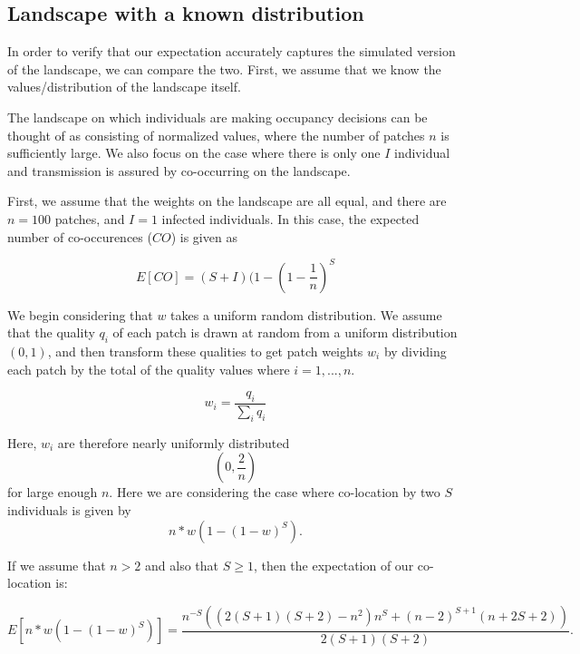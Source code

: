 \subsection{Landscape with a known distribution}

In order to verify that our expectation accurately captures the simulated version of the landscape, we can compare the two. First, we assume that we know the values/distribution of the landscape itself.

The landscape on which individuals are making occupancy decisions can be thought of as consisting of normalized values, where the number of patches $n$ is sufficiently large. We also focus on the case where there is only one $I$ individual and transmission is assured by co-occurring on the landscape.

First, we assume that the weights on the landscape are all equal, and there are $n=100$ patches, and $I=1$ infected individuals. In this case, the expected number of co-occurences ($CO$) is given as 

\begin{equation}
    E[CO] = (S+I)(1-(1-\frac{1}{n})^S
\end{equation}


We begin considering that $w$ takes a uniform random distribution. We assume that the quality $q_i$ of each patch is drawn at random from a uniform distribution $(0,1)$, and then transform these qualities to get patch weights $w_i$ by dividing each patch by the total of the quality values where $i = 1,...,n$. 

\begin{equation}
    w_i = \frac{q_i}{\sum_i{q_i}}
\end{equation}

Here, $w_i$ are therefore nearly uniformly distributed 
\begin{equation}
    (0, \frac{2}{n})
\end{equation} 
for large enough $n$. Here we are considering the case where co-location by two $S$ individuals is given by 
\begin{equation}
    n*w(1-(1-w)^S).
\end{equation} 

If we assume that $n>2$ and also that $S \geq 1$, then the expectation of our co-location is: 

\begin{equation}
    E[n*w(1-(1-w)^S)] = \frac{n^{-S} \left(\left(2 (S+1) (S+2)-n^2\right) n^S+(n-2)^{S+1} (n+2
   S+2)\right)}{2 (S+1) (S+2)}. 
\end{equation}

